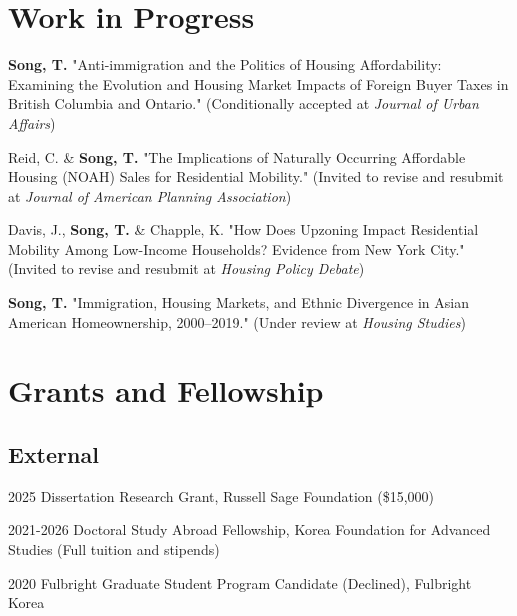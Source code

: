 \documentclass[11pt,letterpaper]{report}
\newcommand{\listitemspace}{0.4em}
\renewenvironment{itemize}
{\begin{list}{}{\setlength{\leftmargin}{0.5em}
\setlength{\parskip}{0em}
\setlength{\itemsep}{\listitemspace}
\setlength{\parsep}{\listitemspace}}}
{\end{list}}
\begin{document}
\section*{Work in Progress}
\begin{itemize}
\setlength{\itemsep}{-0.0em}
\item \textbf{Song, T.} "Anti-immigration and the Politics of Housing Affordability: Examining the Evolution and Housing Market Impacts of Foreign Buyer Taxes in British Columbia and Ontario." (Conditionally accepted at \emph{Journal of Urban Affairs})
\item Reid, C. \& \textbf{Song, T.} "The Implications of Naturally Occurring Affordable Housing (NOAH) Sales for Residential Mobility." (Invited to revise and resubmit at \emph{Journal of American Planning Association})
\item Davis, J., \textbf{Song, T.} \& Chapple, K. "How Does Upzoning Impact Residential Mobility Among Low-Income Households? Evidence from New York City." (Invited to revise and resubmit at \emph{Housing Policy Debate})
\item \textbf{Song, T.} "Immigration, Housing Markets, and Ethnic Divergence in Asian American Homeownership, 2000–2019." (Under review at \emph{Housing Studies})
\end{itemize}


\section*{Grants and Fellowship}
\subsection*{External}
\begin{tablist}
\item[2025] \tab{}Dissertation Research Grant, Russell Sage Foundation (\$15,000)
\item[2021-2026] \tab{}Doctoral Study Abroad Fellowship, Korea Foundation for Advanced Studies (Full tuition and stipends)
\item[2020] \tab{}Fulbright Graduate Student Program Candidate (Declined), Fulbright Korea
\end{tablist}
\end{document}
